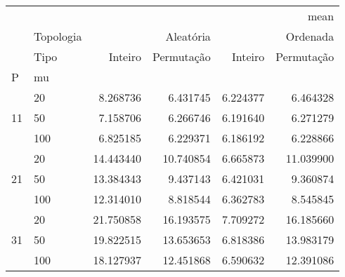 \begin{tabular}{llrrrr}
\toprule
 &  & \multicolumn{4}{r}{mean} \\
 & Topologia & \multicolumn{2}{r}{Aleatória} & \multicolumn{2}{r}{Ordenada} \\
 & Tipo & Inteiro & Permutação & Inteiro & Permutação \\
P & mu &  &  &  &  \\
\midrule
\multirow[t]{3}{*}{11} & 20 & 8.268736 & 6.431745 & 6.224377 & 6.464328 \\
 & 50 & 7.158706 & 6.266746 & 6.191640 & 6.271279 \\
 & 100 & 6.825185 & 6.229371 & 6.186192 & 6.228866 \\
\cline{1-6}
\multirow[t]{3}{*}{21} & 20 & 14.443440 & 10.740854 & 6.665873 & 11.039900 \\
 & 50 & 13.384343 & 9.437143 & 6.421031 & 9.360874 \\
 & 100 & 12.314010 & 8.818544 & 6.362783 & 8.545845 \\
\cline{1-6}
\multirow[t]{3}{*}{31} & 20 & 21.750858 & 16.193575 & 7.709272 & 16.185660 \\
 & 50 & 19.822515 & 13.653653 & 6.818386 & 13.983179 \\
 & 100 & 18.127937 & 12.451868 & 6.590632 & 12.391086 \\
\cline{1-6}
\bottomrule
\end{tabular}
